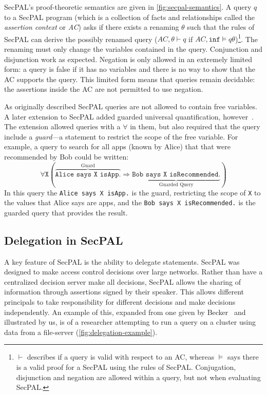 \documentclass[thesis.tex]{subfiles}
\begin{document}
SecPAL's proof-theoretic semantics are given in \autoref{fig:secpal-semantics}.  A
query $q$ to a SecPAL program (which is a collection of facts and
relationships called the \emph{assertion context} or \emph{AC}) asks
if there exists a renaming $\theta$ such that the rules of SecPAL can
derive the possibly renamed query ($AC,\theta \vdash q$
if $AC,\texttt{inf} \models q\theta$)\footnote{$\vdash$ describes if a query
  is valid with respect to an AC, whereas $\models$ says there is a
  valid proof for a SecPAL using the rules of SecPAL.  Conjugation,
  disjunction and negation are allowed within a query, but not when
  evaluating SecPAL.}.  The renaming must only change 
the variables contained in the query. Conjunction and disjunction work
as expected.  Negation is only allowed in an extremely limited form: a
query is false if it has no variables and there is no way
to show that the AC supports the query.  This limited form means that
queries remain decidable: the assertions inside the AC are not permitted to
use negation. 
 
As originally described SecPAL queries are not allowed to contain free variables.
A later extension to SecPAL added guarded universal quantification, however~\cite{moritz_y_becker_secpal:_2009}. 
The extension allowed queries with a $\forall$ in them, but also required that the query include a \emph{guard}---a statement to restrict the scope of the free variable.
For example, a query to search for all apps (known by Alice) that that were recommended by Bob could be written:
\begin{equation*}
  \forall \mathtt{X}\left( \overbrace{\texttt{Alice says X isApp.}}^{\text{Guard}} \Rightarrow \underbrace{\texttt{Bob says X isRecommended.}}_{\text{Guarded Query}}\right)
\end{equation*}
In this query the \texttt{Alice says X isApp.} is the guard, restricting the scope of \texttt{X} to 
the values that Alice says are apps, and the \texttt{Bob says X isRecommended.} is the guarded query that provides the result.

\subsection{Delegation in SecPAL}
\label{ssec:delegation_in_secpal}

A key feature of SecPAL is the ability to delegate statements. SecPAL was
designed to make access control decisions over large networks. Rather than have
a centralized decision server make all decisions, SecPAL allows
the sharing of information through assertions signed by their speaker. This allows
different principals to take responsibility for different decisions and make
decisions independently. An example of this, expanded from one given by
Becker~\cite{becker_secpal:_2006} and illustrated by us, is of a
researcher attempting to run a query on a cluster using data from a file-server
(\autoref{fig:delegation-example}).
\end{document}

